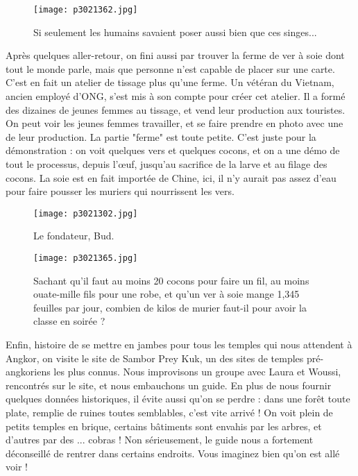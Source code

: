 \documentclass{book}
\begin{document}
\begin{figure}[h]
\centering
\texttt{[image: p3021362.jpg]}
\caption*{Si seulement les humains savaient poser aussi bien que ces singes...}
\end{figure}

Après quelques aller-retour, on fini aussi par trouver la ferme de ver à soie dont tout le monde parle, mais que personne n'est capable de placer sur une carte. C'est en fait un atelier de tissage plus qu'une ferme. Un vétéran du Vietnam, ancien employé d'ONG, s'est mis à son compte pour créer cet atelier. Il a formé des dizaines de jeunes femmes au tissage, et vend leur production aux touristes. On peut voir les jeunes femmes travailler, et se faire prendre en photo avec une de leur production. La partie "ferme" est toute petite. C'est juste pour la démonstration : on voit quelques vers et quelques cocons, et on a une démo de tout le processus, depuis l’œuf, jusqu'au sacrifice de la larve et au filage des cocons. La soie est en fait importée de Chine, ici, il n'y aurait pas assez d'eau pour faire pousser les muriers qui nourrissent les vers.


\begin{figure}[h]
\centering
\texttt{[image: p3021302.jpg]}
\caption*{Le fondateur, Bud.}
\end{figure}


\begin{figure}[h]
\centering
\texttt{[image: p3021365.jpg]}
\caption*{Sachant qu'il faut au moins 20 cocons pour faire un fil, au moins ouate-mille fils pour une robe,  et qu'un ver à soie mange 1,345 feuilles par jour, combien de kilos de murier faut-il pour avoir la classe en soirée ?}
\end{figure}

Enfin, histoire de se mettre en jambes pour tous les temples qui nous attendent à Angkor, on visite le site de Sambor Prey Kuk, un des sites de temples pré-angkoriens les plus connus. Nous improvisons un groupe avec Laura et Woussi, rencontrés sur le site, et nous embauchons un guide. En plus de nous fournir quelques données historiques, il évite aussi qu'on se perdre : dans une forêt toute plate, remplie de ruines toutes semblables, c'est vite arrivé ! On voit plein de petits temples en brique, certains bâtiments sont envahis par les arbres, et d'autres par des ... cobras ! Non sérieusement, le guide nous a fortement déconseillé de rentrer dans certains endroits. Vous imaginez bien qu'on est allé voir !
\end{document}
